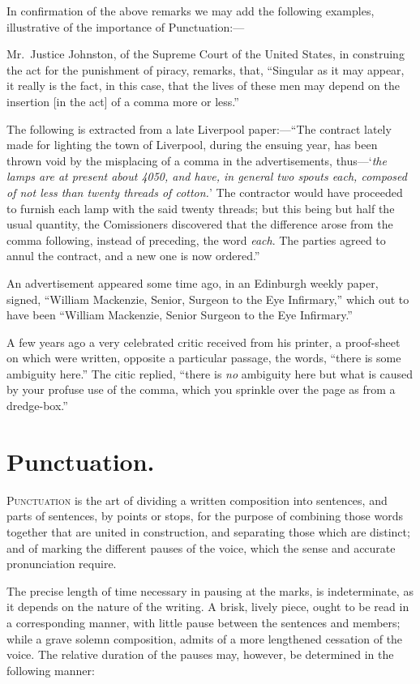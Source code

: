 In confirmation of the above remarks we may add the following examples,
illustrative of the importance of Punctuation:---

\small
Mr.\ Justice Johnston, of the Supreme Court of the United States, in construing
the act for the punishment of piracy, remarks, that, ``Singular as it may
appear, it really is the fact, in this case, that the lives of these men may
depend on the insertion [in the act] of a comma more or less.''

The following is extracted from a late Liverpool paper:---``The contract lately
made for lighting the town of Liverpool, during the ensuing year, has been
thrown void by the misplacing of a comma in the advertisements, thus---`{\em{}the
lamps are at present about 4050, and have, in general two spouts each, composed
of not less than twenty threads of cotton.}' The contractor would have proceeded
to furnish each lamp with the said twenty threads; but this being but half the
usual quantity, the Comissioners discovered that the difference arose from the
comma following, instead of preceding, the word \emph{each}. The parties agreed
to annul the contract, and a new one is now ordered.''

An advertisement appeared some time ago, in an Edinburgh weekly paper, signed,
``William Mackenzie, Senior, Surgeon to the Eye Infirmary,'' which out to have
been ``William Mackenzie, Senior Surgeon to the Eye Infirmary.''

A few years ago a very celebrated critic received from his printer, a
proof-sheet on which were written, opposite a particular passage, the words,
``there is some ambiguity here.'' The citic replied, ``there is \emph{no}
ambiguity here but what is caused by your profuse use of the comma, which you
sprinkle over the page as from a dredge-box.''
\normalsize

\section{Punctuation.}
\textsc{Punctuation} is the art of dividing a written composition into
sentences, and parts of sentences, by points or stops, for the purpose of
combining those words together that are united in construction, and separating
those which are distinct; and of marking the different pauses of the voice,
which the sense and accurate pronunciation require.

\small
The precise length of time necessary in pausing at the marks, is indeterminate,
as it depends on the nature of the writing. A brisk, lively piece, ought to be
read in a corresponding manner, with little pause between the sentences and
members; while a grave solemn composition, admits of a more lengthened cessation
of the voice. The relative duration of the pauses may, however, be determined in
the following manner:

